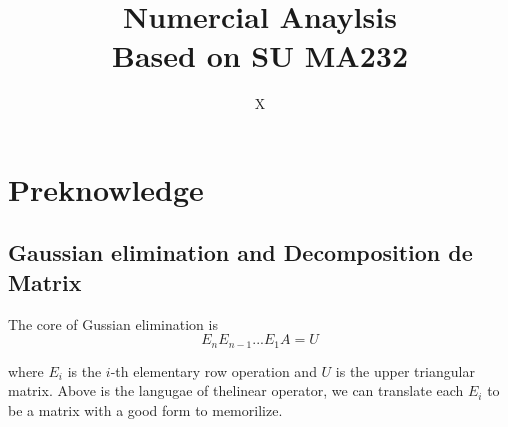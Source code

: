\documentclass[en,hazy,black,pc,12pt]{elegantnote}
\title{Numercial Anaylsis
\\ Based on SU MA232
}
\author{X}
\institute{Elegant\LaTeX{} Program}
\begin{document}
\maketitle

\newpage



\section{Preknowledge}
\subsection{Gaussian elimination and Decomposition de Matrix}

The core of Gussian elimination is 
\[E_nE_{n-1}...E_1 A = U\]

where $E_i$ is the $i$-th elementary row operation and $U$ is the upper triangular matrix.  Above is the langugae of thelinear operator, we can translate each \(E_i\) to be a matrix with a good form to memorilize.
\end{document}
